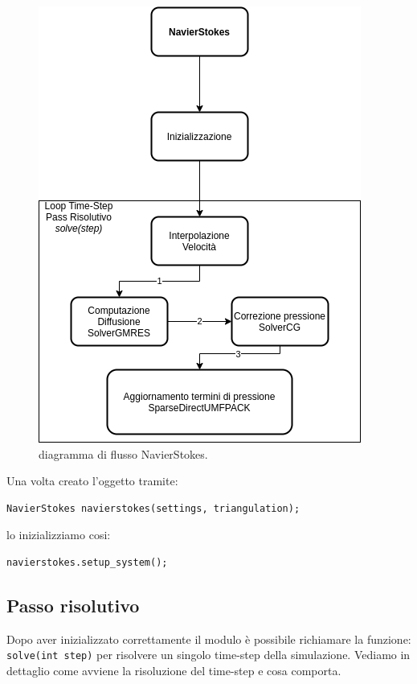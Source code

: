         \begin{figure}[H]
            \centering
            \includegraphics[width=\linewidth]{diagrammi/diagrammiNavier.png}
            \caption{diagramma di flusso NavierStokes.}
        \end{figure}
        Una volta creato l'oggetto tramite:
        \begin{verbatim}
NavierStokes navierstokes(settings, triangulation);
        \end{verbatim}
        lo inizializziamo cosi:
        \begin{verbatim}
navierstokes.setup_system();
        \end{verbatim}

        \subsection{Passo risolutivo}
        Dopo aver inizializzato correttamente il modulo è possibile richiamare la funzione:
        \texttt{solve(int step)}
        per risolvere un singolo time-step della simulazione. Vediamo in dettaglio come avviene la risoluzione del time-step e cosa comporta.

